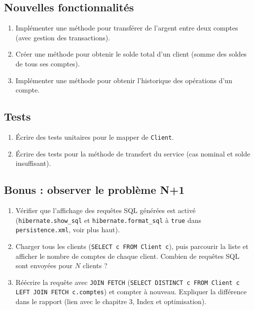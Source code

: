 \documentclass[11pt]{article}
\begin{document}
\subsection{Nouvelles fonctionnalités}
\begin{enumerate}
\item Implémenter une méthode pour transférer de l'argent entre deux comptes (avec gestion des transactions).
\item Créer une méthode pour obtenir le solde total d'un client (somme des soldes de tous ses comptes).
\item Implémenter une méthode pour obtenir l'historique des opérations d'un compte.
\end{enumerate}

\subsection{Tests}
\begin{enumerate}
\item Écrire des tests unitaires pour le mapper de \texttt{Client}.
\item Écrire des tests pour la méthode de transfert du service (cas nominal et solde insuffisant).
\end{enumerate}

\subsection{Bonus : observer le problème \og N+1 \fg}
\begin{enumerate}
\item Vérifier que l'affichage des requêtes SQL générées est activé (\texttt{hibernate.show\_sql} et \texttt{hibernate.format\_sql} à \texttt{true} dans \texttt{persistence.xml}, voir plus haut).
\item Charger tous les clients (\texttt{SELECT c FROM Client c}), puis parcourir la liste et afficher le nombre de comptes de chaque client.
      Combien de requêtes SQL sont envoyées pour $N$ clients ?
\item Réécrire la requête avec \texttt{JOIN FETCH} (\texttt{SELECT DISTINCT c FROM Client c LEFT JOIN FETCH c.comptes}) et compter à nouveau.
      Expliquer la différence dans le rapport (lien avec le chapitre 3, Index et optimisation).
\end{enumerate}
\end{document}
